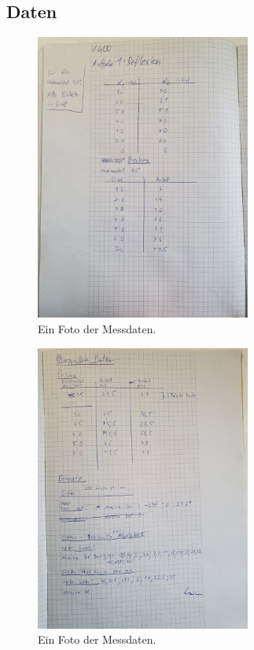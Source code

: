 \subsection{Daten}
\begin{figure}[H]
    \centering
    \includegraphics[width=0.63\textwidth]{latex/images/werte1.jpeg}
    \caption{Ein Foto der Messdaten.}
    \label{img:Daten1}
\end{figure}

\begin{figure}[H]
    \centering
    \includegraphics[width=0.63\textwidth]{latex/images/werte2.jpeg}
    \caption{Ein Foto der Messdaten.}
    \label{img:Daten2}
\end{figure}

